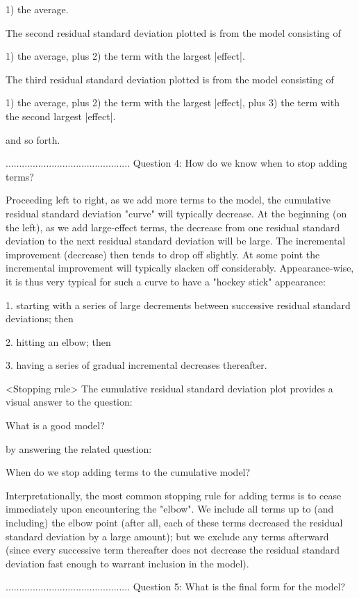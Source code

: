    1) the average.

The second residual standard deviation plotted is
from the model consisting of

   1) the average, plus
   2) the term with the largest |effect|.

The third residual standard deviation plotted is
from the model consisting of

   1) the average, plus
   2) the term with the largest |effect|, plus
   3) the term with the second largest |effect|.

and so forth.

..............................................
Question 4: How do we know when to stop adding terms?

Proceeding left to right, as we add more terms to
the model, the cumulative residual standard
deviation "curve" will typically decrease.  At the
beginning (on the left), as we add large-effect
terms, the decrease from one residual standard
deviation to the next residual standard deviation
will be large.  The incremental improvement
(decrease) then tends to drop off slightly.  At
some point the incremental improvement will
typically slacken off considerably.
Appearance-wise, it is thus very typical for such
a curve to have a "hockey stick" appearance:

   1. starting with a series of large decrements
      between successive residual standard
      deviations; then

   2. hitting an elbow; then

   3. having a series of gradual incremental
      decreases thereafter.

<Stopping rule>
The cumulative residual standard deviation plot
provides a visual answer to the question:

   What is a good model?

by answering the related question:

   When do we stop adding terms to the cumulative model?

Interpretationally, the most common stopping rule
for adding terms is to cease immediately upon
encountering the "elbow".  We include all terms up
to (and including) the elbow point (after all,
each of these terms decreased the residual
standard deviation by a large amount); but we
exclude any terms afterward (since every
successive term thereafter does not decrease the
residual standard deviation fast enough to warrant
inclusion in the model).

..............................................
Question 5: What is the final form for the model?

